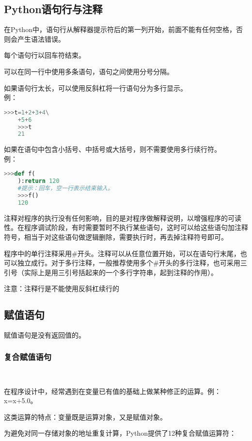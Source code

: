 \documentclass[11pt,a4paper]{article}
\begin{document}
\subsection{Python语句行与注释}

在Python中，语句行从解释器提示符后的第一列开始，前面不能有任何空格，否则会产生语法错误。

每个语句行以回车符结束。

可以在同一行中使用多条语句，语句之间使用分号分隔。

如果语句行太长，可以使用反斜杠将一行语句分为多行显示。\\
例：
\begin{lstlisting}[language={Python}]
    >>>t=1+2+3+4\
    +5+6
    >>>t
    21
\end{lstlisting}

如果在语句中包含小括号、中括号或大括号，则不需要使用多行续行符。\\
例：
\begin{lstlisting}[language={Python}]
    >>>def f(
    ):return 120
    #提示：回车，空一行表示结束输入。
    >>>f()
    120
\end{lstlisting}

注释对程序的执行没有任何影响，目的是对程序做解释说明，以增强程序的可读性。在程序调试阶段，有时需要暂时不执行某些语句，这时可以给这些语句加注释符号，相当于对这些语句做逻辑删除，需要执行时，再去掉注释符号即可。

程序中的单行注释采用\#开头。注释可以从任意位置开始，可以在语句行末尾，也可以独立成行。对于多行注释，一般推荐使用多个\#开头的多行注释，也可采用三引号（实际上是用三引号括起来的一个多行字符串，起到注释的作用）。

注意：注释行是不能使用反斜杠续行的

\subsection{赋值语句}

赋值语句是没有返回值的。

\subsubsection{复合赋值语句}~{}

在程序设计中，经常遇到在变量已有值的基础上做某种修正的运算。例：x=x+5.0。

这类运算的特点：变量既是运算对象，又是赋值对象。

为避免对同一存储对象的地址重复计算，Python提供了12种复合赋值运算符：
\end{document}
